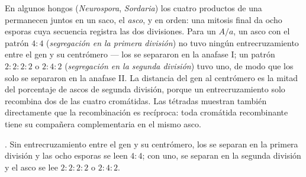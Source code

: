 \begin{proposition}\label{prop:b2:meiosis-heredity:tetrads}
En algunos hongos (\emph{Neurospora}, \emph{Sordaria}) los cuatro
productos de una  permanecen juntos en un saco, el \emph{asco}, y
en orden: una mitosis final da ocho esporas cuya secuencia registra las
dos divisiones. Para un  $A/a$, un asco con el patrón
$4 : 4$ (\emph{segregación en la primera división}) no tuvo ningún
entrecruzamiento entre el gen y su centrómero --- los  se separaron
en la anafase I; un
patrón $2 : 2 : 2 : 2$ o $2 : 4 : 2$ (\emph{segregación en la segunda
división}) tuvo uno, de modo que los  solo se separaron en la
anafase II. La distancia del gen al centrómero es la mitad del porcentaje
de ascos de segunda división, porque un entrecruzamiento solo recombina
dos de las cuatro cromátidas. Las tétradas muestran también directamente
que la recombinación es recíproca: toda cromátida recombinante tiene su
compañera complementaria en el mismo asco.
\end{proposition}

\begin{omfigure}

{\small {}. Sin entrecruzamiento entre el gen y su
centrómero, los  se separan en la primera división y las ocho
esporas se leen $4 : 4$; con uno, se separan en la segunda división y el
asco se lee $2 : 2 : 2 : 2$ o $2 : 4 : 2$.}
\end{omfigure}

